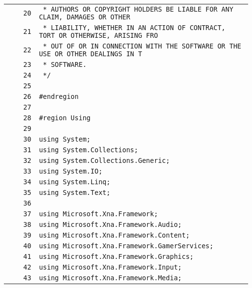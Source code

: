\documentclass[a4paper,10pt]{article}
\begin{document}
\begin{longtable}[l]{lrrl}
\cellcolor{gray} &  & \verb~20~ & \verb~ * AUTHORS OR COPYRIGHT HOLDERS BE LIABLE FOR ANY CLAIM, DAMAGES OR OTHER~\\
\cellcolor{gray} &  & \verb~21~ & \verb~ * LIABILITY, WHETHER IN AN ACTION OF CONTRACT, TORT OR OTHERWISE, ARISING FRO~\\
\cellcolor{gray} &  & \verb~22~ & \verb~ * OUT OF OR IN CONNECTION WITH THE SOFTWARE OR THE USE OR OTHER DEALINGS IN T~\\
\cellcolor{gray} &  & \verb~23~ & \verb~ * SOFTWARE.~\\
\cellcolor{gray} &  & \verb~24~ & \verb~ */~\\
\cellcolor{gray} &  & \verb~25~ & \verb~~\\
\cellcolor{gray} &  & \verb~26~ & \verb~#endregion~\\
\cellcolor{gray} &  & \verb~27~ & \verb~~\\
\cellcolor{gray} &  & \verb~28~ & \verb~#region Using~\\
\cellcolor{gray} &  & \verb~29~ & \verb~~\\
\cellcolor{gray} &  & \verb~30~ & \verb~using System;~\\
\cellcolor{gray} &  & \verb~31~ & \verb~using System.Collections;~\\
\cellcolor{gray} &  & \verb~32~ & \verb~using System.Collections.Generic;~\\
\cellcolor{gray} &  & \verb~33~ & \verb~using System.IO;~\\
\cellcolor{gray} &  & \verb~34~ & \verb~using System.Linq;~\\
\cellcolor{gray} &  & \verb~35~ & \verb~using System.Text;~\\
\cellcolor{gray} &  & \verb~36~ & \verb~~\\
\cellcolor{gray} &  & \verb~37~ & \verb~using Microsoft.Xna.Framework;~\\
\cellcolor{gray} &  & \verb~38~ & \verb~using Microsoft.Xna.Framework.Audio;~\\
\cellcolor{gray} &  & \verb~39~ & \verb~using Microsoft.Xna.Framework.Content;~\\
\cellcolor{gray} &  & \verb~40~ & \verb~using Microsoft.Xna.Framework.GamerServices;~\\
\cellcolor{gray} &  & \verb~41~ & \verb~using Microsoft.Xna.Framework.Graphics;~\\
\cellcolor{gray} &  & \verb~42~ & \verb~using Microsoft.Xna.Framework.Input;~\\
\cellcolor{gray} &  & \verb~43~ & \verb~using Microsoft.Xna.Framework.Media;~\\

\end{longtable}
\end{document}
